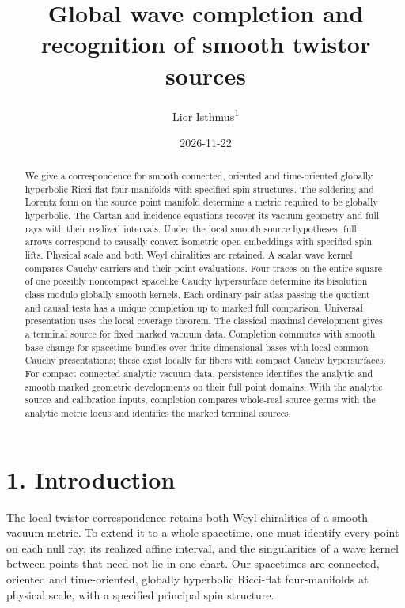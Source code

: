\documentclass[
  english,
  11pt,
  reqno]{amsart}
\title[Global wave completion]{Global wave completion and recognition of smooth twistor sources}
\author[Lior Isthmus]{Lior Isthmus\textsuperscript{1}}
\date{2026-11-22}
\begin{document}
\begin{abstract}
\label{sec:abstract}
We give a correspondence for smooth connected, oriented and
time-oriented globally hyperbolic Ricci-flat four-manifolds with
specified spin structures. The soldering and Lorentz form on the source
point manifold determine a metric required to be globally hyperbolic.
The Cartan and incidence equations recover its vacuum geometry and full
rays with their realized intervals. Under the local smooth source
hypotheses, full arrows correspond to causally convex isometric open
embeddings with specified spin lifts. Physical scale and both Weyl
chiralities are retained. A scalar wave kernel compares Cauchy carriers
and their point evaluations. Four traces on the entire square of one
possibly noncompact spacelike Cauchy hypersurface determine its
bisolution class modulo globally smooth kernels. Each ordinary-pair
atlas passing the quotient and causal tests has a unique completion up
to marked full comparison. Universal presentation uses the local
coverage theorem. The classical maximal development gives a terminal
source for fixed marked vacuum data. Completion commutes with smooth
base change for spacetime bundles over finite-dimensional bases with
local common-Cauchy presentations; these exist locally for fibers with
compact Cauchy hypersurfaces. For compact connected analytic vacuum
data, persistence identifies the analytic and smooth marked geometric
developments on their full point domains. With the analytic source and
calibration inputs, completion compares whole-real source germs with the
analytic metric locus and identifies the marked terminal sources.
\end{abstract}
\maketitle
{}
\setcounter{footnote}{1}
\clearpage
{}\label{sec:contents}
{\setcounter{tocdepth}{1}\tableofcontents}
\removelastskip


\protect{}\label{sec:scope-and-main-result}

\section{1. Introduction}\label{introduction}

The local twistor correspondence retains both Weyl chiralities of a
smooth vacuum metric. To extend it to a whole spacetime, one must
identify every point on each null ray, its realized affine interval, and
the singularities of a wave kernel between points that need not lie in
one chart. Our spacetimes are connected, oriented and time-oriented,
globally hyperbolic Ricci-flat four-manifolds at physical scale, with a
specified principal spin structure.
\end{document}
